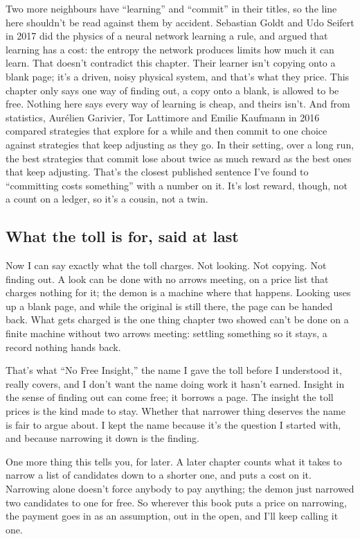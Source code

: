 \documentclass[11pt,twoside]{article}
\theoremstyle{thielethm}
\theoremstyle{thieledef}
\theoremstyle{thieledef}
\theoremstyle{thieledef}
\theoremstyle{thielethm}
\theoremstyle{thieleobs}
\theoremstyle{thielethm}
\begin{document}
Two more neighbours have ``learning'' and ``commit'' in their titles, so the line here shouldn't be read against them by accident. Sebastian Goldt and Udo Seifert in 2017 did the physics of a neural network learning a rule, and argued that learning has a cost: the entropy the network produces limits how much it can learn. That doesn't contradict this chapter. Their learner isn't copying onto a blank page; it's a driven, noisy physical system, and that's what they price. This chapter only says one way of finding out, a copy onto a blank, is allowed to be free. Nothing here says every way of learning is cheap, and theirs isn't. And from statistics, Aurélien Garivier, Tor Lattimore and Emilie Kaufmann in 2016 compared strategies that explore for a while and then commit to one choice against strategies that keep adjusting as they go. In their setting, over a long run, the best strategies that commit lose about twice as much reward as the best ones that keep adjusting. That's the closest published sentence I've found to ``committing costs something'' with a number on it. It's lost reward, though, not a count on a ledger, so it's a cousin, not a twin.

\subsection{What the toll is for, said at last}

Now I can say exactly what the toll charges. Not looking. Not copying. Not finding out. A look can be done with no arrows meeting, on a price list that charges nothing for it; the demon is a machine where that happens. Looking uses up a blank page, and while the original is still there, the page can be handed back. What gets charged is the one thing chapter two showed can't be done on a finite machine without two arrows meeting: settling something so it stays, a record nothing hands back.

That's what ``No Free Insight,'' the name I gave the toll before I understood it, really covers, and I don't want the name doing work it hasn't earned. Insight in the sense of finding out can come free; it borrows a page. The insight the toll prices is the kind made to stay. Whether that narrower thing deserves the name is fair to argue about. I kept the name because it's the question I started with, and because narrowing it down is the finding.

One more thing this tells you, for later. A later chapter counts what it takes to narrow a list of candidates down to a shorter one, and puts a cost on it. Narrowing alone doesn't force anybody to pay anything; the demon just narrowed two candidates to one for free. So wherever this book puts a price on narrowing, the payment goes in as an assumption, out in the open, and I'll keep calling it one.
\end{document}
